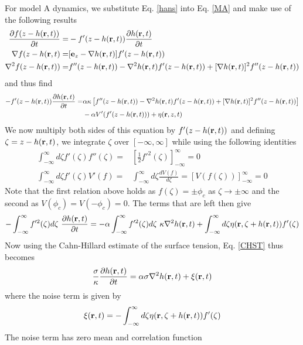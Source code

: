 For model A dynamics, we substitute Eq. \eqref{hans} into Eq. \eqref{MA} and make use of the following results
\begin{align}
\frac{\partial f(z-h({\bf r},t))}{\partial t} =& -f'(z-h({\bf r},t))\frac{\partial h({\bf r},t)}{\partial t}\\
\nabla f(z-h({\bf r},t) =& [{\bf e}_z-\nabla h({\bf r},t)]f'(z-h({\bf r},t)) \\
\nabla^2 f(z-h({\bf r},t))=& f''(z-h({\bf r},t))- \nabla^2 h({\bf r},t)f'(z-h({\bf r},t))+ [\nabla h({\bf r},t)]^2 f''(z-h({\bf r},t))
\label{triple-interface}
\end{align}
and thus find
\begin{align}
-f'(z-h({\bf r},t))\frac{\partial h({\bf r},t)}{\partial t}=& \alpha\kappa 
\left[ f''(z-h({\bf r},t))- \nabla^2 h({\bf r},t)f'(z-h({\bf r},t))+ [\nabla h({\bf r},t)]^2 f''(z-h({\bf r},t))\right] \\
& - \alpha V'(f'(z-h({\bf r},t))) + \eta({\bf r},z,t)
\label{fdhdt}
\end{align}
We now multiply both sides of this equation by $f'(z-h({\bf r},t))$ and defining $\zeta=z-h({\bf r},t)$, we integrate $\zeta$ over $[-\infty,\infty]$ while using the following identities
\begin{align*}
\int_{-\infty}^\infty d\zeta f'(\zeta)f''(\zeta) =& [\frac{1}{2}f'^2(\zeta)]_{-\infty}^\infty =0 \\
\int_{-\infty}^\infty d\zeta f'(\zeta) V'(f) =& \int_{-\infty}^\infty d\zeta\frac{d V(f)}{d\zeta} =[V(f(\zeta))]_{-\infty}^\infty=0
\end{align*} 
Note that the first relation above holds as $f(\zeta)=\pm \phi_c$ as $\zeta\to\pm \infty$ and the second as
$V(\phi_c)=V(-\phi_c)=0$.
The terms that are left then give
\begin{equation}
-\int_{-\infty}^\infty f'^2(\zeta)d\zeta\ \frac{\partial h(\br,t)}{\partial t}
= -\alpha\int_{-\infty}^\infty f'^2(\zeta)d\zeta \ \kappa \nabla^2 h(\br,t) + \int_{-\infty}^\infty d\zeta \eta(\br,\zeta+ h(\br,t))f'(\zeta)
\end{equation}
Now using the Cahn-Hillard estimate of the surface tension, Eq. \eqref{CHST} thus becomes
\begin{equation}
\frac{\sigma}{\kappa} \frac{\partial h({\bf r},t)}{\partial t} = \alpha\sigma \nabla^2 h({\bf r},t) +\xi({\bf r},t)
\end{equation}
where the noise term is given by
\begin{equation}
\xi({\bf r},t)= -\int_{-\infty}^\infty d\zeta \eta({\bf r},\zeta+ h({\bf r},t))f'(\zeta)
\end{equation}
The noise term has zero mean and correlation function
